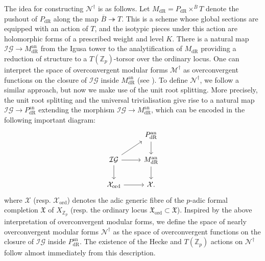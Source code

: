 \documentclass[10pt, oneside]{amsart}
\numberwithin{equation}{subsection}
\theoremstyle{definition}
\theoremstyle{remark}
\newcommand{\mbb}[1]{\mathbb{#1}}
\newcommand{\opn}[1]{\operatorname{#1}}
\begin{document}
The idea for constructing $\mathscr{N}^{\dagger}$ is as follows. Let $M_{\opn{dR}} = P_{\opn{dR}} \times^{\overline{B}} T$ denote the pushout of $P_{\opn{dR}}$ along the map $\overline{B} \twoheadrightarrow T$. This is a scheme whose global sections are equipped with an action of $T$, and the isotypic pieces under this action are holomorphic forms of a prescribed weight and level $K$. There is a natural map $\mathcal{IG} \to M_{\opn{dR}}^{\opn{an}}$ from the Igusa tower to the analytification of $M_{\opn{dR}}$ providing a reduction of structure to a $T(\mbb{Z}_p)$-torsor over the ordinary locus. One can interpret the space of overconvergent modular forms $\mathscr{M}^{\dagger}$ as overconvergent functions on the closure of $\mathcal{IG}$ inside $M_{\opn{dR}}^{\opn{an}}$ (see \cite{Pilloni, AIS}). To define $\mathscr{N}^{\dagger}$, we follow a similar approach, but now we make use of the unit root splitting. More precisely, the unit root splitting and the universal trivialisation give rise to a natural map $\mathcal{IG} \to P_{\opn{dR}}^{\opn{an}}$ extending the morphism $\mathcal{IG} \to M_{\opn{dR}}^{\opn{an}}$, which can be encoded in the following important diagram:
\begin{equation*}
\begin{tikzcd}
& P_{\opn{dR}}^{\opn{an}} \arrow[d] \\
\mathcal{IG} \arrow[r] \arrow[d] \arrow[ur] & M_{\opn{dR}}^{\opn{an}} \arrow[d] \\
\mathcal{X}_{\opn{ord}} \arrow[r] & \mathcal{X}.
\end{tikzcd}
\end{equation*}
where $\mathcal{X}$ (resp. $\mathcal{X}_{\opn{ord}}$) denotes the adic generic fibre of the $p$-adic formal completion $\mathfrak{X}$ of $X_{\mbb{Z}_p}$ (resp. the ordinary locus $\mathfrak{X}_{\opn{ord}} \subset \mathfrak{X}$). Inspired by the above interpretation of overconvergent modular forms, we define the space of nearly overconvergent modular forms $\mathscr{N}^{\dagger}$ as the space of overconvergent functions on the closure of $\mathcal{IG}$ inside $P_{\opn{dR}}^{\opn{an}}$. The existence of the Hecke and $T(\mbb{Z}_p)$ actions on $\mathscr{N}^{\dagger}$ follow almost immediately from this description.
\end{document}

